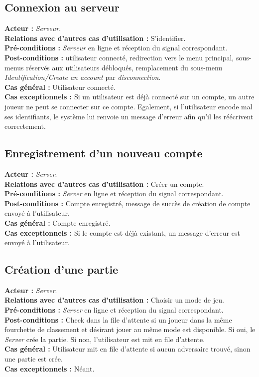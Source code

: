 \documentclass[10pt, a4paper]{article}
\begin{document}
\subsection{Connexion au serveur}
\textbf{Acteur :} \textit{Serveur}. \\
\textbf{Relations avec d'autres cas d'utilisation :} S'identifier. \\
\textbf{Pré-conditions :} \textit{Serveur} en ligne et réception du signal correspondant. \\
\textbf{Post-conditions :} utilisateur connecté, redirection vers le menu principal, sous-menus réservés aux utilisateurs débloqués, remplacement du sous-menu \textit{Identification/Create an account} par \textit{disconnection}. \\
\textbf{Cas général :} Utilisateur connecté. \\
\textbf{Cas exceptionnels :} Si un utilisateur est déjà connecté sur un compte, un autre joueur ne peut se connecter sur ce compte. Egalement, si l’utilisateur encode mal ses identifiants, le système lui renvoie un message d’erreur afin qu’il les réécrivent correctement. \\

\subsection{Enregistrement d'un nouveau compte}
\textbf{Acteur :} \textit{Server}. \\
\textbf{Relations avec d'autres cas d'utilisation :} Créer un compte. \\
\textbf{Pré-conditions :} \textit{Server} en ligne et réception du signal correspondant. \\
\textbf{Post-conditions :} Compte enregistré, message de succès de création de compte envoyé à l'utilisateur. \\
\textbf{Cas général :} Compte enregistré. \\
\textbf{Cas exceptionnels :} Si le compte est déjà existant, un message d'erreur est envoyé à l'utilisateur. \\
		
\subsection{Création d'une partie}
\textbf{Acteur :} \textit{Server}. \\
\textbf{Relations avec d'autres cas d'utilisation :} Choisir un mode de jeu. \\
\textbf{Pré-conditions :} \textit{Server} en ligne et réception du signal correspondant. \\
\textbf{Post-conditions :} Check dans la file d'attente si un joueur dans la même fourchette de classement et désirant jouer au même mode est disponible. Si oui, le \textit{Server} crée la partie. Si non, l'utilisateur est mit en file d'attente. \\
\textbf{Cas général :} Utilisateur mit en file d'attente si aucun adversaire trouvé, sinon une partie est crée. \\
\textbf{Cas exceptionnels :} Néant. \\
\end{document}
